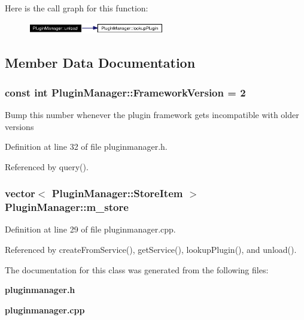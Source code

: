 Here is the call graph for this function:\begin{figure}[H]
\begin{center}
\leavevmode
\includegraphics[width=169pt]{classPluginManager_PluginManagere3_cgraph}
\end{center}
\end{figure}


\subsection{Member Data Documentation}
\subsubsection{\setlength{\rightskip}{0pt plus 5cm}const int {\bf Plugin\-Manager::Framework\-Version} = 2\hspace{0.3cm}{\tt  [static]}}\label{classPluginManager_PluginManagers0}


Bump this number whenever the plugin framework gets incompatible with older versions 

Definition at line 32 of file pluginmanager.h.

Referenced by query().
\subsubsection{\setlength{\rightskip}{0pt plus 5cm}vector$<$ {\bf Plugin\-Manager::Store\-Item} $>$ {\bf Plugin\-Manager::m\_\-store}\hspace{0.3cm}{\tt  [static, private]}}\label{classPluginManager_PluginManagerv0}




Definition at line 29 of file pluginmanager.cpp.

Referenced by create\-From\-Service(), get\-Service(), lookup\-Plugin(), and unload().

The documentation for this class was generated from the following files:\begin{CompactItemize}
\item 
{\bf pluginmanager.h}\item 
{\bf pluginmanager.cpp}\end{CompactItemize}
